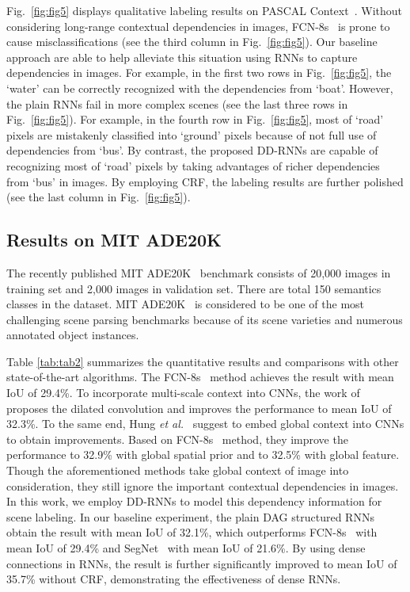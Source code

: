 \documentclass[10pt,twocolumn,letterpaper]{article}
\begin{document}
Fig.~\ref{fig:fig5} displays qualitative labeling results on PASCAL Context~\cite{mottaghi2014role}. Without considering long-range contextual dependencies in images, FCN-8s~\cite{long2015fully} is prone to cause misclassifications (see the third column in Fig.~\ref{fig:fig5}). Our baseline approach are able to help alleviate this situation using RNNs to capture dependencies in images. For example, in the first two rows in Fig.~\ref{fig:fig5}, the `water' can be correctly recognized with the dependencies from `boat'. However, the plain RNNs fail in more complex scenes (see the last three rows in Fig.~\ref{fig:fig5}). For example, in the fourth row in Fig.~\ref{fig:fig5}, most of `road' pixels are mistakenly classified into `ground' pixels because of not full use of dependencies from `bus'. By contrast, the proposed DD-RNNs are capable of recognizing most of `road' pixels by taking advantages of richer dependencies from `bus' in images. By employing CRF, the labeling results are further polished (see the last column in Fig.~\ref{fig:fig5}).

\subsection{Results on MIT ADE20K}

The recently published MIT ADE20K~\cite{zhou2017scene} benchmark consists of 20,000 images in training set and 2,000 images in validation set. There are total 150 semantics classes in the dataset. MIT ADE20K~\cite{zhou2017scene} is considered to be one of the most challenging scene parsing benchmarks because of its scene varieties and numerous annotated object instances.

Table \ref{tab:tab2} summarizes the quantitative results and comparisons with other state-of-the-art algorithms. The FCN-8s~\cite{long2015fully} method achieves the result with mean IoU of 29.4\%. To incorporate multi-scale context into CNNs, the work of~\cite{yu2015multi} proposes the dilated convolution and improves the performance to mean IoU of 32.3\%. To the same end, Hung {\it et al.}~\cite{hung2017scene} suggest to embed global context into CNNs to obtain improvements. Based on FCN-8s~\cite{long2015fully} method, they improve the performance to 32.9\% with global spatial prior and to 32.5\% with global feature. Though the aforementioned methods take global context of image into consideration, they still ignore the important contextual dependencies in images. In this work, we employ DD-RNNs to model this dependency information for scene labeling. In our baseline experiment, the plain DAG structured RNNs obtain the result with mean IoU of 32.1\%, which outperforms FCN-8s~\cite{long2015fully} with mean IoU of 29.4\% and SegNet~\cite{badrinarayanan2015segnet} with mean IoU of 21.6\%. By using dense connections in RNNs, the result is further significantly improved to mean IoU of 35.7\% without CRF, demonstrating the effectiveness of dense RNNs.
\end{document}
